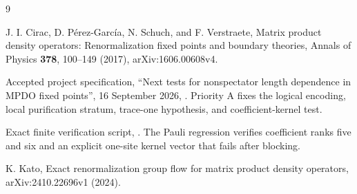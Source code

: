 \begin{thebibliography}{9}

	J. I. Cirac, D. P\'erez-Garc\'ia, N. Schuch, and F. Verstraete,
	Matrix product density operators: Renormalization fixed points and
	boundary theories, Annals of Physics \textbf{378}, 100--149 (2017),
	arXiv:1606.00608v4.

	Accepted project specification,
	``Next tests for nonspectator length dependence in MPDO fixed points'',
	16 September 2026,
	.
	Priority A fixes the logical encoding, local purification stratum,
	trace-one hypothesis, and coefficient-kernel test.

	Exact finite verification script,
	.
	The Pauli regression verifies coefficient ranks five and six and
	an explicit one-site kernel vector that fails after blocking.

	K. Kato,
	Exact renormalization group flow for matrix product density operators,
	arXiv:2410.22696v1 (2024).

\end{thebibliography}
